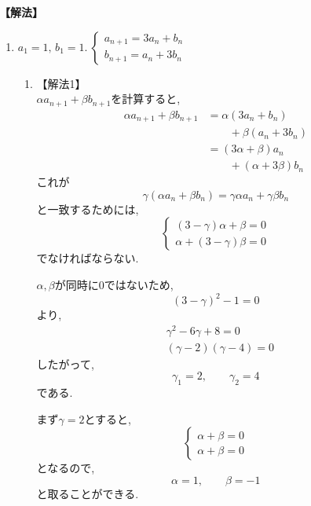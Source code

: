     \noindent\textbf{【解法】}
    \begin{enumerate}[label=(\arabic*),parsep=3pt]
    \item $\displaystyle a_1=1,\,b_1=1.\ \begin{cases}a_{n+1}=3a_n+b_n\\ b_{n+1}=a_n+3b_n\end{cases}$\\
          \begin{enumerate}
            \item 【解法1】\\
                  $\alpha a_{n+1}+\beta b_{n+1}$を計算すると,
                  \begin{align*}
                    \alpha a_{n+1}+\beta b_{n+1}
                      &=\alpha(3a_n+b_n)\\
                      &\qquad +\beta(a_n+3b_n)\\
                      &=(3\alpha+\beta)a_n\\
                      &\qquad +(\alpha+3\beta)b_n
                  \end{align*}
                  これが
                  \[
                    \gamma(\alpha a_n+\beta b_n)
                    =\gamma\alpha a_n+\gamma\beta b_n
                  \]
                  と一致するためには,
                  \[
                  \begin{cases}
                    (3-\gamma)\alpha+\beta=0\\
                    \alpha+(3-\gamma)\beta=0
                  \end{cases}
                  \]
                  でなければならない.

                  $\alpha,\beta$が同時に$0$ではないため,
                  \[
                    (3-\gamma)^2-1=0
                  \]
                  より,
                  \begin{align*}
                    &\gamma^2-6\gamma+8=0\\
                    &(\gamma-2)(\gamma-4)=0
                  \end{align*}
                  したがって,
                  \[
                    \gamma_1=2,\qquad\gamma_2=4
                  \]
                  である.

                  まず$\gamma=2$とすると,
                  \[
                  \begin{cases}
                    \alpha+\beta=0\\
                    \alpha+\beta=0
                  \end{cases}
                  \]
                  となるので,
                  \[
                    \alpha=1,\qquad\beta=-1
                  \]
                  と取ることができる.


\end{enumerate}
\end{enumerate}
